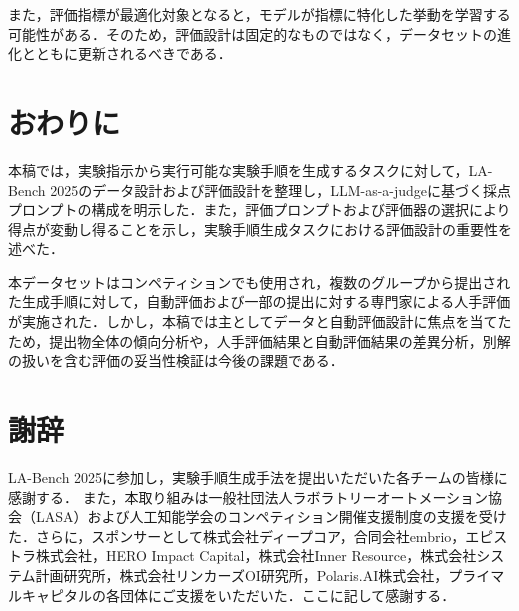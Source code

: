 \documentclass[twocolumn]{jarticle}
\begin{document}
また，評価指標が最適化対象となると，モデルが指標に特化した挙動を学習する可能性がある．そのため，評価設計は固定的なものではなく，データセットの進化とともに更新されるべきである．

\section{おわりに}
本稿では，実験指示から実行可能な実験手順を生成するタスクに対して，LA-Bench 2025のデータ設計および評価設計を整理し，LLM-as-a-judgeに基づく採点プロンプトの構成を明示した．また，評価プロンプトおよび評価器の選択により得点が変動し得ることを示し，実験手順生成タスクにおける評価設計の重要性を述べた．

本データセットはコンペティションでも使用され，複数のグループから提出された生成手順に対して，自動評価および一部の提出に対する専門家による人手評価が実施された．しかし，本稿では主としてデータと自動評価設計に焦点を当てたため，提出物全体の傾向分析や，人手評価結果と自動評価結果の差異分析，別解の扱いを含む評価の妥当性検証は今後の課題である．

\section*{謝辞}
LA-Bench 2025に参加し，実験手順生成手法を提出いただいた各チームの皆様に感謝する．
また，本取り組みは一般社団法人ラボラトリーオートメーション協会（LASA）および人工知能学会のコンペティション開催支援制度の支援を受けた．さらに，スポンサーとして株式会社ディープコア，合同会社embrio，エピストラ株式会社，HERO Impact Capital，株式会社Inner Resource，株式会社システム計画研究所，株式会社リンカーズOI研究所，Polaris.AI株式会社，プライマルキャピタルの各団体にご支援をいただいた．ここに記して感謝する．



\end{document}
